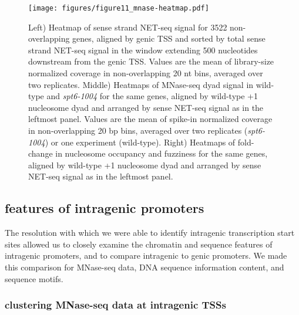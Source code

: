 \documentclass[10pt, letterpaper]{article}
\begin{document}
\begin{figure}[H]
\centering
\texttt{[image: figures/figure11\_mnase-heatmap.pdf]}
\caption{Left) Heatmap of sense strand NET-seq signal for 3522 non-overlapping genes, aligned by genic TSS and sorted by total sense strand NET-seq signal in the window extending 500 nucleotides downstream from the genic TSS. Values are the mean of library-size normalized coverage in non-overlapping 20 nt bins, averaged over two replicates. Middle) Heatmaps of MNase-seq dyad signal in wild-type and \textit{spt6-1004} for the same genes, aligned by wild-type +1 nucleosome dyad and arranged by sense NET-seq signal as in the leftmost panel. Values are the mean of spike-in normalized coverage in non-overlapping 20 bp bins, averaged over two replicates (\textit{spt6-1004}) or one experiment (wild-type). Right) Heatmaps of fold-change in nucleosome occupancy and fuzziness for the same genes, aligned by wild-type +1 nucleosome dyad and arranged by sense NET-seq signal as in the leftmost panel.}
\label{fig:mnase_heatmap}
\end{figure}

\subsection{features of intragenic promoters}

The resolution with which we were able to identify intragenic transcription start sites allowed us to closely examine the chromatin and sequence features of intragenic promoters, and to compare intragenic to genic promoters. We made this comparison for MNase-seq data, DNA sequence information content, and sequence motifs.

\subsubsection{clustering MNase-seq data at intragenic TSSs}
\end{document}

